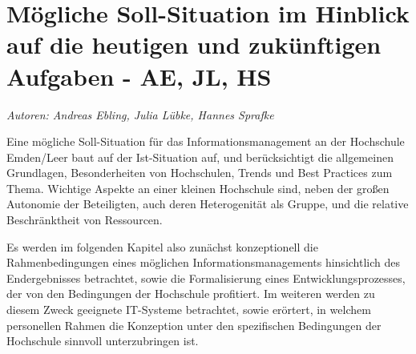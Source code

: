 \chapter{Mögliche Soll-Situation im Hinblick auf die heutigen und zukünftigen Aufgaben - AE, JL, HS}
\label{chapter_sollsituation_INM}
\textit{Autoren: Andreas Ebling, Julia Lübke, Hannes Sprafke}

Eine mögliche Soll-Situation für das Informationsmanagement an der Hochschule Emden/Leer baut auf der Ist-Situation auf, und berücksichtigt die allgemeinen Grundlagen, Besonderheiten von Hochschulen, Trends und Best Practices zum Thema. Wichtige Aspekte an einer kleinen Hochschule sind, neben der großen Autonomie der Beteiligten, auch deren Heterogenität als Gruppe, und die relative Beschränktheit von Ressourcen.

Es werden im folgenden Kapitel also zunächst konzeptionell die Rahmenbedingungen eines möglichen Informationsmanagements hinsichtlich des Endergebnisses betrachtet, sowie die Formalisierung eines Entwicklungsprozesses, der von den Bedingungen der Hochschule profitiert. Im weiteren werden zu diesem Zweck geeignete IT-Systeme betrachtet, sowie erörtert, in welchem personellen Rahmen die Konzeption unter den spezifischen Bedingungen der Hochschule sinnvoll unterzubringen ist.





